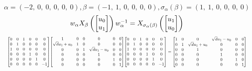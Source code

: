 \documentclass[11pt]{article}
\theoremstyle{definition}
\begin{document}
\[
\alpha = \left( -2, \  0, \  0, \  0, \  0, \  0\right), \beta = \left( -1, \  1, \  0, \  0, \  0, \  0\right), \sigma_{\alpha}(\beta) = \left( 1, \  1, \  0, \  0, \  0, \  0\right)
\]
\[
\scaletoalign{\textwidth}{w_{\alpha} X_{\beta}\left(\left[\begin{matrix}u_{0}\\u_{1}\end{matrix}\right]\right) w_{\alpha}^{-1} = X_{\sigma_{\alpha}\left(\beta\right)}\left(\left[\begin{matrix}u_{1}\\u_{0}\end{matrix}\right]\right)}
\]
\[
\scaletoalign{\textwidth}{{\left[\begin{matrix}0 & 0 & 1 & 0 & 0 & 0\\0 & 1 & 0 & 0 & 0 & 0\\1 & 0 & 0 & 0 & 0 & 0\\0 & 0 & 0 & 1 & 0 & 0\\0 & 0 & 0 & 0 & 1 & 0\\0 & 0 & 0 & 0 & 0 & -1\end{matrix}\right]} {\left[\begin{matrix}1 & 0 & 0 & 0 & 0 & 0\\\sqrt{d} u_{1} + u_{0} & 1 & 0 & 0 & 0 & 0\\0 & 0 & 1 & \sqrt{d} u_{1} - u_{0} & 0 & 0\\0 & 0 & 0 & 1 & 0 & 0\\0 & 0 & 0 & 0 & 1 & 0\\0 & 0 & 0 & 0 & 0 & 1\end{matrix}\right]} {\left[\begin{matrix}0 & 0 & 1 & 0 & 0 & 0\\0 & 1 & 0 & 0 & 0 & 0\\1 & 0 & 0 & 0 & 0 & 0\\0 & 0 & 0 & 1 & 0 & 0\\0 & 0 & 0 & 0 & 1 & 0\\0 & 0 & 0 & 0 & 0 & -1\end{matrix}\right]} = {\left[\begin{matrix}1 & 0 & 0 & \sqrt{d} u_{1} - u_{0} & 0 & 0\\0 & 1 & \sqrt{d} u_{1} + u_{0} & 0 & 0 & 0\\0 & 0 & 1 & 0 & 0 & 0\\0 & 0 & 0 & 1 & 0 & 0\\0 & 0 & 0 & 0 & 1 & 0\\0 & 0 & 0 & 0 & 0 & 1\end{matrix}\right]}}
\]
\end{document}
